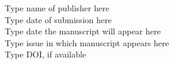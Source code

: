 \begin{singlespace}
  \noindent Type name of publisher here\\
  Type date of submission here\\ %
  Type date the manuscript will appear here \\ %
  Type issue in which manuscript appears here \\ %
  Type DOI, if available
\end{singlespace}


